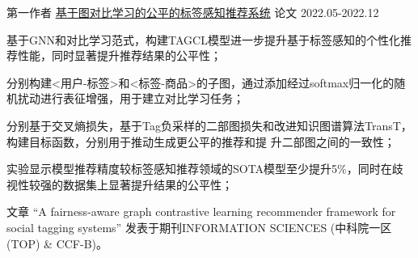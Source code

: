 \begin{cventries}
\cventry
{第一作者} %
{\href{https://www.sciencedirect.com/science/article/pii/S0020025523006497}{基于图对比学习的公平的标签感知推荐系统}} %
{论文} %
{2022.05-2022.12} %
{
  \begin{cvitems} %
    \item {基于GNN和对比学习范式，构建TAGCL模型进一步提升基于标签感知的个性化推荐性能，同时显著提升推荐结果的公平性；}
    \item {分别构建<用户-标签>和<标签-商品>的子图，通过添加经过softmax归一化的随机扰动进行表征增强，用于建立对比学习任务；}
    \item {分别基于交叉熵损失，基于Tag负采样的二部图损失和改进知识图谱算法TransT，构建目标函数，分别用于推动生成更公平的推荐和提
    升二部图之间的一致性；}
    \item {实验显示模型推荐精度较标签感知推荐领域的SOTA模型至少提升5\%，同时在歧视性较强的数据集上显著提升结果的公平性；}
    \item {文章 “A fairness-aware graph contrastive learning recommender framework for social tagging systems” 发表于期刊INFORMATION SCIENCES (中科院一区(TOP) \& CCF-B)。}   
  \end{cvitems}
}



\end{cventries}
